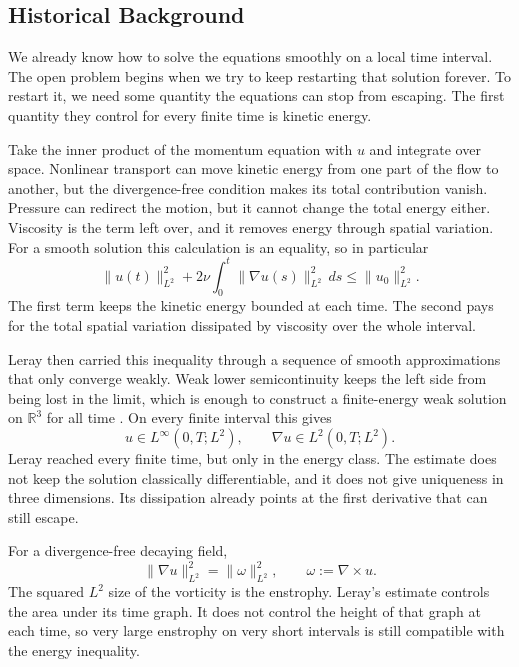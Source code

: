 \subsection{Historical Background}\label{sub:HistoricalEstimates}

We already know how to solve the equations smoothly on a local time interval.
The open problem begins when we try to keep restarting that solution forever.
To restart it, we need some quantity the equations can stop from escaping.
The first quantity they control for every finite time is kinetic energy.


Take the inner product of the momentum equation with \(u\) and integrate over space.
Nonlinear transport can move kinetic energy from one part of the flow to another, but the divergence-free condition makes its total contribution vanish.
Pressure can redirect the motion, but it cannot change the total energy either.
Viscosity is the term left over, and it removes energy through spatial variation.
For a smooth solution this calculation is an equality, so in particular
\begin{equation}\label{eq:LerayEnergyInequality}
  \lVert u(t)\rVert_{L^2}^{2}
  +2\nu\int_0^t\lVert\nabla u(s)\rVert_{L^2}^{2}\,ds
  \leq
  \lVert u_0\rVert_{L^2}^{2}.
\end{equation}
The first term keeps the kinetic energy bounded at each time.
The second pays for the total spatial variation dissipated by viscosity over the whole interval.

Leray then carried this inequality through a sequence of smooth approximations that only converge weakly.
Weak lower semicontinuity keeps the left side from being lost in the limit, which is enough to construct a finite-energy weak solution on \(\mathbb R^3\) for all time \parencite{Leray1934}.
On every finite interval this gives
\[
  u\in L^\infty(0,T;L^2),
  \qquad
  \nabla u\in L^2(0,T;L^2).
\]
Leray reached every finite time, but only in the energy class.
The estimate does not keep the solution classically differentiable, and it does not give uniqueness in three dimensions.
Its dissipation already points at the first derivative that can still escape.


For a divergence-free decaying field,
\[
  \lVert\nabla u\rVert_{L^2}^{2}
  =
  \lVert\omega\rVert_{L^2}^{2},
  \qquad
  \omega:=\nabla\times u.
\]
The squared \(L^2\) size of the vorticity is the enstrophy.
Leray's estimate controls the area under its time graph.
It does not control the height of that graph at each time, so very large enstrophy on very short intervals is still compatible with the energy inequality.

